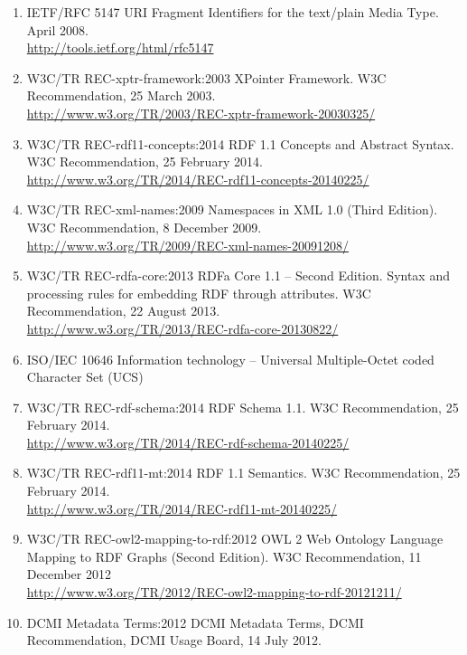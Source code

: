 \documentclass[10pt,fleqn,final]{scrreprt}
\begin{document}
\begin{enumerate}[label=\bfseries NR\arabic*:]
  \item{IETF/RFC 5147} {URI Fragment Identifiers for the text/plain Media Type.  April 2008.\\ \url{http://tools.ietf.org/html/rfc5147}}
  \item{W3C/TR REC-xptr-framework:2003} {XPointer Framework.  W3C Recommendation, 25 March 2003. \\ \url{http://www.w3.org/TR/2003/REC-xptr-framework-20030325/}}
  \item{W3C/TR REC-rdf11-concepts:2014} {RDF 1.1 Concepts and Abstract Syntax.  W3C Recommendation, 25 February 2014. \\ \url{http://www.w3.org/TR/2014/REC-rdf11-concepts-20140225/}}
  \item{W3C/TR REC-xml-names:2009} {Namespaces in XML 1.0 (Third Edition). W3C Recommendation, 8 December 2009.\\
   \url{http://www.w3.org/TR/2009/REC-xml-names-20091208/}}
  \item{W3C/TR REC-rdfa-core:2013} {RDFa Core 1.1 -- Second Edition.  Syntax and processing rules for embedding RDF through attributes. W3C Recommendation, 22 August 2013.\\ \url{http://www.w3.org/TR/2013/REC-rdfa-core-20130822/}}
  \item{ISO/IEC 10646} {Information technology – Universal Multiple-Octet coded Character Set (UCS)}
  \item{W3C/TR REC-rdf-schema:2014} {RDF Schema 1.1. W3C Recommendation, 25 February 2014.\\ \url{http://www.w3.org/TR/2014/REC-rdf-schema-20140225/}}
  \item{W3C/TR REC-rdf11-mt:2014} {RDF 1.1 Semantics.  W3C Recommendation, 25 February 2014. \\ \url{http://www.w3.org/TR/2014/REC-rdf11-mt-20140225/}}
  \item{W3C/TR REC-owl2-mapping-to-rdf:2012} {OWL 2 Web Ontology Language
Mapping to RDF Graphs (Second Edition).  W3C Recommendation, 11 December 2012\\ \url{http://www.w3.org/TR/2012/REC-owl2-mapping-to-rdf-20121211/}}
  \item{DCMI Metadata Terms:2012} {DCMI Metadata Terms, DCMI Recommendation, DCMI Usage Board, 14 July 2012.\\
}
\end{enumerate}
\end{document}
